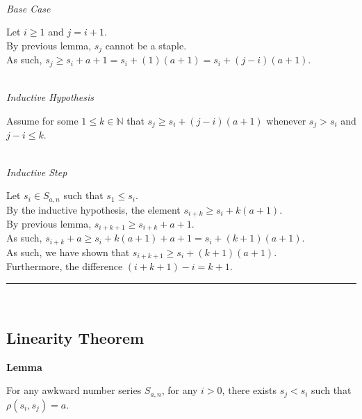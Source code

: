 \documentclass[a4paper,12pt]{article}
\begin{document}
\noindent \\
\textit{Base Case}

\noindent Let $i \geq 1$ and $j = i + 1$.\\

\noindent By previous lemma, $s_j$ cannot be a staple.\\

\noindent As such, $s_j \geq s_i + a + 1 = s_i + (1)(a + 1) = s_i + (j - i)(a + 1)$.


\noindent \\
\textit{Inductive Hypothesis}

\noindent Assume for some $1 \leq k \in \mathbb{N}$ that $s_j \geq s_i + (j - i)(a + 1)$ whenever $s_j > s_i$ and $j - i \leq k$.


\noindent \\
\textit{Inductive Step}

\noindent Let $s_i \in S_{a, n}$ such that $s_1 \leq s_i$.\\

\noindent By the inductive hypothesis, the element $s_{i + k} \geq s_i + k(a + 1)$.\\

\noindent By previous lemma, $s_{i + k + 1} \geq s_{i + k} + a + 1$.\\

\noindent As such, $s_{i + k} + a \geq s_i + k(a + 1) + a + 1 = s_i + (k + 1)(a + 1)$.\\

\noindent As such, we have shown that $s_{i + k + 1} \geq s_i + (k + 1)(a + 1)$.\\

\noindent Furthermore, the difference $(i + k + 1) - i = k + 1$.

\begin{center}
\noindent\rule{8cm}{0.4pt}
\end{center}
\noindent \\



\subsection{Linearity Theorem}



\label{lemma:relation_to_other}
\hypertarget{lemma:relation_to_other}{}
\begin{tcolorbox}
\textbf{Lemma}

For any awkward number series $S_{a,n}$, for any $i > 0$, there exists $s_j < s_i$ such that $\rho(s_i, s_j) = a$.

\end{tcolorbox}
\end{document}
